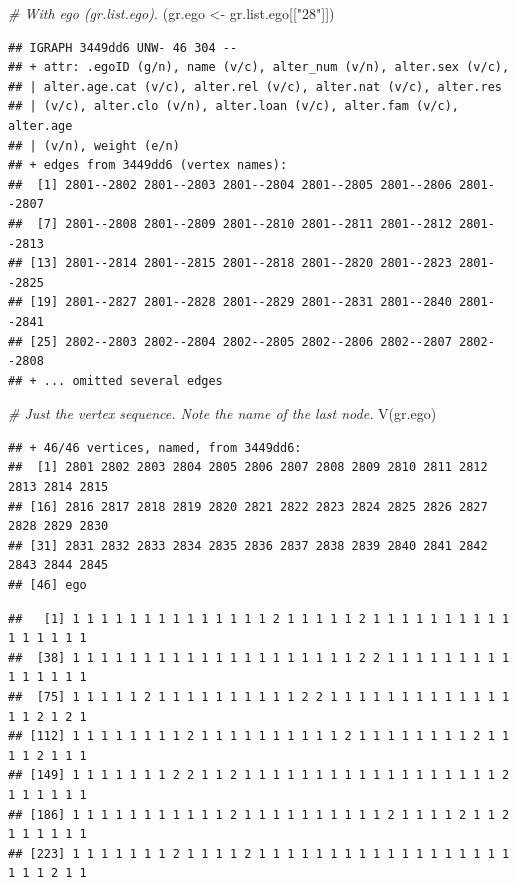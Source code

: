 \documentclass[
]{book}
\newenvironment{Shaded}{\begin{snugshade}}{\end{snugshade}}
\newcommand{\CommentTok}[1]{\textcolor[rgb]{0.56,0.35,0.01}{\textit{#1}}}
\newcommand{\FunctionTok}[1]{\textcolor[rgb]{0.00,0.00,0.00}{#1}}
\newcommand{\NormalTok}[1]{#1}
\newcommand{\OtherTok}[1]{\textcolor[rgb]{0.56,0.35,0.01}{#1}}
\newcommand{\SpecialCharTok}[1]{\textcolor[rgb]{0.00,0.00,0.00}{#1}}
\newcommand{\StringTok}[1]{\textcolor[rgb]{0.31,0.60,0.02}{#1}}
\begin{document}
\begin{Shaded}
\begin{Highlighting}[]
\CommentTok{\# With ego (gr.list.ego). }
\NormalTok{(gr.ego }\OtherTok{\textless{}{-}}\NormalTok{ gr.list.ego[[}\StringTok{"28"}\NormalTok{]])}
\end{Highlighting}
\end{Shaded}

\begin{verbatim}
## IGRAPH 3449dd6 UNW- 46 304 -- 
## + attr: .egoID (g/n), name (v/c), alter_num (v/n), alter.sex (v/c),
## | alter.age.cat (v/c), alter.rel (v/c), alter.nat (v/c), alter.res
## | (v/c), alter.clo (v/n), alter.loan (v/c), alter.fam (v/c), alter.age
## | (v/n), weight (e/n)
## + edges from 3449dd6 (vertex names):
##  [1] 2801--2802 2801--2803 2801--2804 2801--2805 2801--2806 2801--2807
##  [7] 2801--2808 2801--2809 2801--2810 2801--2811 2801--2812 2801--2813
## [13] 2801--2814 2801--2815 2801--2818 2801--2820 2801--2823 2801--2825
## [19] 2801--2827 2801--2828 2801--2829 2801--2831 2801--2840 2801--2841
## [25] 2802--2803 2802--2804 2802--2805 2802--2806 2802--2807 2802--2808
## + ... omitted several edges
\end{verbatim}

\begin{Shaded}
\begin{Highlighting}[]
\CommentTok{\# Just the vertex sequence. Note the name of the last node.}
\FunctionTok{V}\NormalTok{(gr.ego)}
\end{Highlighting}
\end{Shaded}

\begin{verbatim}
## + 46/46 vertices, named, from 3449dd6:
##  [1] 2801 2802 2803 2804 2805 2806 2807 2808 2809 2810 2811 2812 2813 2814 2815
## [16] 2816 2817 2818 2819 2820 2821 2822 2823 2824 2825 2826 2827 2828 2829 2830
## [31] 2831 2832 2833 2834 2835 2836 2837 2838 2839 2840 2841 2842 2843 2844 2845
## [46] ego
\end{verbatim}

\begin{Shaded}
\end{Shaded}

\begin{verbatim}
##   [1] 1 1 1 1 1 1 1 1 1 1 1 1 1 1 2 1 1 1 1 1 2 1 1 1 1 1 1 1 1 1 1 1 1 1 1 1 1
##  [38] 1 1 1 1 1 1 1 1 1 1 1 1 1 1 1 1 1 1 1 1 2 2 1 1 1 1 1 1 1 1 1 1 1 1 1 1 1
##  [75] 1 1 1 1 1 2 1 1 1 1 1 1 1 1 1 1 2 2 1 1 1 1 1 1 1 1 1 1 1 1 1 1 1 2 1 2 1
## [112] 1 1 1 1 1 1 1 1 2 1 1 1 1 1 1 1 1 1 1 2 1 1 1 1 1 1 1 1 2 1 1 1 1 2 1 1 1
## [149] 1 1 1 1 1 1 1 2 2 1 1 2 1 1 1 1 1 1 1 1 1 1 1 1 1 1 1 1 1 1 2 1 1 1 1 1 1
## [186] 1 1 1 1 1 1 1 1 1 1 1 2 1 1 1 1 1 1 1 1 1 1 2 1 1 1 1 2 1 1 2 1 1 1 1 1 1
## [223] 1 1 1 1 1 1 1 2 1 1 1 1 2 1 1 1 1 1 1 1 1 1 1 1 1 1 1 1 1 1 1 1 1 1 2 1 1
\end{verbatim}
\end{document}
